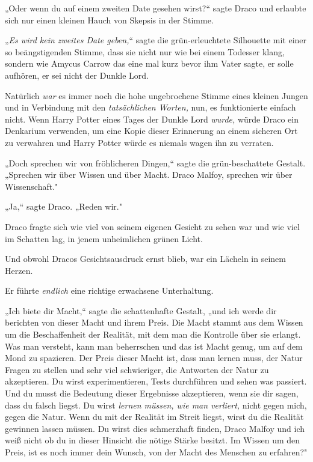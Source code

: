 {„Oder wenn du auf einem zweiten Date gesehen wirst?“ sagte Draco und erlaubte sich nur einen kleinen Hauch von Skepsis in der Stimme.

„\emph{Es wird kein zweites Date geben,}“ sagte die grün-erleuchtete Silhouette mit einer so beängstigenden Stimme, dass sie nicht nur wie bei einem Todesser klang, sondern wie Amycus Carrow das eine mal kurz bevor ihm Vater sagte, er solle aufhören, er sei nicht der Dunkle Lord.

Natürlich \emph{war} es immer noch die hohe ungebrochene Stimme eines kleinen Jungen und in Verbindung mit den \emph{tatsächlichen Worten,} nun, es funktionierte einfach nicht. Wenn Harry Potter eines Tages der Dunkle Lord \emph{wurde,} würde Draco ein Denkarium verwenden, um eine Kopie dieser Erinnerung an einem sicheren Ort zu verwahren und Harry Potter würde es niemals wagen ihn zu verraten.

„Doch sprechen wir von fröhlicheren Dingen,“ sagte die grün-beschattete Gestalt. „Sprechen wir über Wissen und über Macht. Draco Malfoy, sprechen wir über Wissenschaft."

„Ja,“ sagte Draco. „Reden wir."

Draco fragte sich wie viel von seinem eigenen Gesicht zu sehen war und wie viel im Schatten lag, in jenem unheimlichen grünen Licht.

Und obwohl Dracos Gesichtsausdruck ernst blieb, war ein Lächeln in seinem Herzen.

Er führte \emph{endlich} eine richtige erwachsene Unterhaltung.

„Ich biete dir Macht,“ sagte die schattenhafte Gestalt, „und ich werde dir berichten von dieser Macht und ihrem Preis. Die Macht stammt aus dem Wissen um die Beschaffenheit der Realität, mit dem man die Kontrolle über sie erlangt. Was man versteht, kann man beherrschen und das ist Macht genug, um auf dem Mond zu spazieren. Der Preis dieser Macht ist, dass man lernen muss, der Natur Fragen zu stellen und sehr viel schwieriger, die Antworten der Natur zu akzeptieren. Du wirst experimentieren, Tests durchführen und sehen was passiert. Und du musst die Bedeutung dieser Ergebnisse akzeptieren, wenn sie dir sagen, dass du falsch liegst. Du wirst \emph{lernen müssen, wie man verliert,} nicht gegen mich, gegen die Natur. Wenn du mit der Realität im Streit liegst, wirst du die Realität gewinnen lassen müssen. Du wirst dies schmerzhaft finden, Draco Malfoy und ich weiß nicht ob du in dieser Hinsicht die nötige Stärke besitzt. Im Wissen um den Preis, ist es noch immer dein Wunsch, von der Macht des Menschen zu erfahren?"

}
